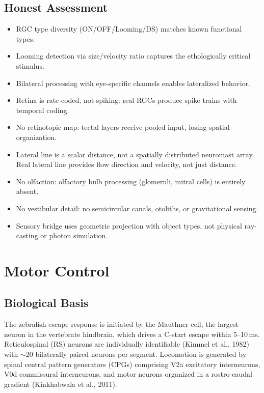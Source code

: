 \documentclass[11pt,a4paper]{article}
\begin{document}
\subsection{Honest Assessment}

\begin{itemize}[leftmargin=*]
\item[\textcolor{realistic}{$\checkmark$}] RGC type diversity (ON/OFF/Looming/DS)
  matches known functional types.
\item[\textcolor{realistic}{$\checkmark$}] Looming detection via size/velocity
  ratio captures the ethologically critical stimulus.
\item[\textcolor{realistic}{$\checkmark$}] Bilateral processing with eye-specific
  channels enables lateralized behavior.
\item[\textcolor{missing}{$\times$}] Retina is rate-coded, not spiking: real RGCs
  produce spike trains with temporal coding.
\item[\textcolor{missing}{$\times$}] No retinotopic map: tectal layers receive
  pooled input, losing spatial organization.
\item[\textcolor{missing}{$\times$}] Lateral line is a scalar distance, not a
  spatially distributed neuromast array.  Real lateral line provides flow
  direction and velocity, not just distance.
\item[\textcolor{missing}{$\times$}] No olfaction: olfactory bulb processing
  (glomeruli, mitral cells) is entirely absent.
\item[\textcolor{missing}{$\times$}] No vestibular detail: no semicircular canals,
  otoliths, or gravitational sensing.
\item[\textcolor{missing}{$\times$}] Sensory bridge uses geometric projection
  with object types, not physical ray-casting or photon simulation.
\end{itemize}

\section{Motor Control}
\label{sec:motor}

\subsection{Biological Basis}

The zebrafish escape response is initiated by the Mauthner cell, the largest
neuron in the vertebrate hindbrain, which drives a C-start escape within 5--10\,ms.
Reticulospinal (RS) neurons are individually identifiable (Kimmel et al., 1982)
with $\sim$20 bilaterally paired neurons per segment.  Locomotion is generated by
spinal central pattern generators (CPGs) comprising V2a excitatory interneurons,
V0d commissural interneurons, and motor neurons organized in a rostro-caudal
gradient (Kinkhabwala et al., 2011).
\end{document}
